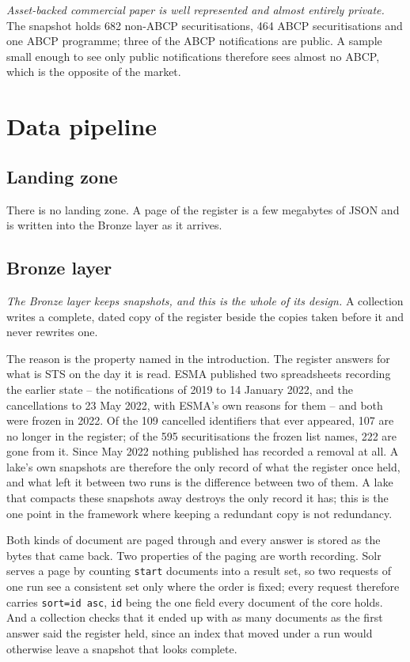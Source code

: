 \emph{Asset-backed commercial paper is well represented and almost entirely private.} The snapshot holds 682 non-ABCP securitisations, 464 ABCP securitisations and one ABCP programme; three of the ABCP notifications are public. A sample small enough to see only public notifications therefore sees almost no ABCP, which is the opposite of the market.

\section{Data pipeline}

\subsection{Landing zone}

There is no landing zone. A page of the register is a few megabytes of JSON and is written into the Bronze layer as it arrives.

\subsection{Bronze layer}\label{sec:sts-bronze}

\emph{The Bronze layer keeps snapshots, and this is the whole of its design.} A collection writes a complete, dated copy of the register beside the copies taken before it and never rewrites one.

The reason is the property named in the introduction. The register answers for what is STS on the day it is read. ESMA published two spreadsheets recording the earlier state -- the notifications of 2019 to 14 January 2022, and the cancellations to 23 May 2022, with ESMA's own reasons for them -- and both were frozen in 2022. Of the 109 cancelled identifiers that ever appeared, 107 are no longer in the register; of the 595 securitisations the frozen list names, 222 are gone from it. Since May 2022 nothing published has recorded a removal at all. A lake's own snapshots are therefore the only record of what the register once held, and what left it between two runs is the difference between two of them. A lake that compacts these snapshots away destroys the only record it has; this is the one point in the framework where keeping a redundant copy is not redundancy.

Both kinds of document are paged through and every answer is stored as the bytes that came back. Two properties of the paging are worth recording. Solr serves a page by counting \verb|start| documents into a result set, so two requests of one run see a consistent set only where the order is fixed; every request therefore carries \verb|sort=id asc|, \verb|id| being the one field every document of the core holds. And a collection checks that it ended up with as many documents as the first answer said the register held, since an index that moved under a run would otherwise leave a snapshot that looks complete.

